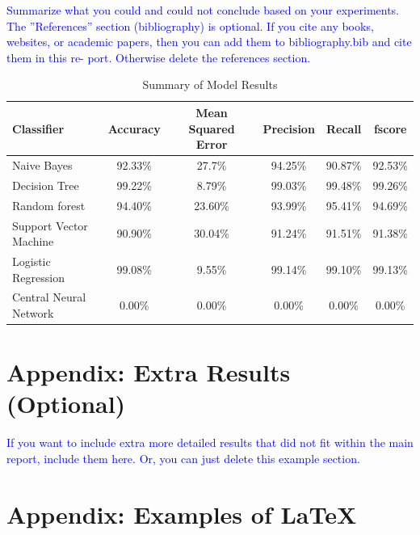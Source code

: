 \documentclass[10pt,twocolumn,letterpaper]{article}
\begin{document}
\textcolor{blue}{Summarize what you could and could not conclude based on your experiments.
The ”References” section (bibliography) is optional. If you cite any books, websites, or academic papers, then you can add them to bibliography.bib and cite them in this re- port. Otherwise delete the references section.}

\begin{table}[!hb]\centering
   \begin{center}
   \begin{tabular}{|l|c|c|c|c|c|}
   \hline
    Classifier & Accuracy & Mean Squared Error & Precision & Recall & fscore\\
   \hline\hline
   Naive Bayes & 92.33\% & 27.7\% & 94.25\% & 90.87\% & 92.53\% \\
   Decision Tree & 99.22\% & 8.79\% & 99.03\% & 99.48\% & 99.26\% \\
   Random forest & 94.40\% & 23.60\% & 93.99\% & 95.41\% & 94.69\%\\
   Support Vector Machine & 90.90\% & 30.04\% & 91.24\% & 91.51\% & 91.38\% \\
   Logistic Regression & 99.08\% & 9.55\% & 99.14\% & 99.10\% & 99.13\% \\
   Central Neural Network & 0.00\% & 0.00\% & 0.00\% & 0.00\% & 0.00\% \\
   \hline
   \end{tabular}
   \end{center}
   \caption{Summary of Model Results\label{first_table}}
\end{table}

{\small


}


\newpage
\appendix


\section*{Appendix: Extra Results (Optional)}

\textcolor{blue}{If you want to include extra more detailed results that did not fit within the main report, include them here. Or, you can just delete this example section.}

\section*{Appendix: Examples of \LaTeX}
\end{document}
